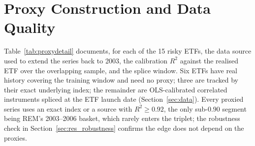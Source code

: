 \appendix
\section{Proxy Construction and Data Quality}
\label{app:data}

Table~\ref{tab:proxydetail} documents, for each of the 15 risky ETFs, the data
source used to extend the series back to 2003, the calibration $R^2$ against the
realised ETF over the overlapping sample, and the splice window. Six ETFs have real
history covering the training window and need no proxy; three are tracked by their exact
underlying index; the remainder are OLS-calibrated correlated instruments spliced at
the ETF launch date (Section~\ref{sec:data}). Every proxied series uses an exact index
or a source with $R^2 \geq 0.92$, the only sub-$0.90$ segment being REM's 2003--2006
basket, which rarely enters the triplet; the robustness check in
Section~\ref{sec:res_robustness} confirms the edge does not depend on the proxies.

